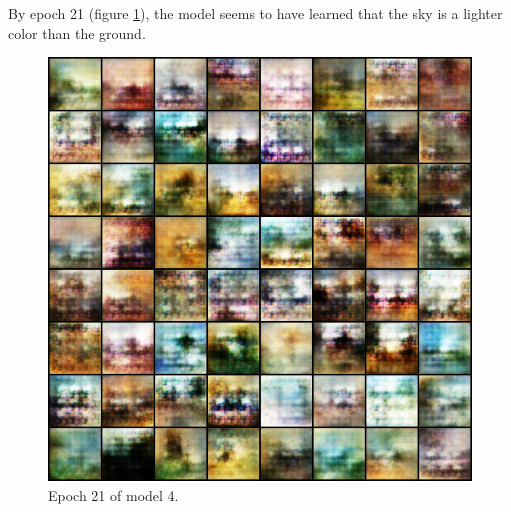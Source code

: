\documentclass[11pt,letterpaper]{article}
\begin{document}
				By epoch 21 (figure \ref{fig:wa64:epoch021generator}), the model seems to have learned that the sky is a lighter color than the ground.
				\begin{figure}
					\centering
					\includegraphics[width=1.0\linewidth]{results/model4/epoch021_generator}
					\caption{Epoch 21 of model 4.}
					\label{fig:wa64:epoch021generator}
				\end{figure}
\end{document}

